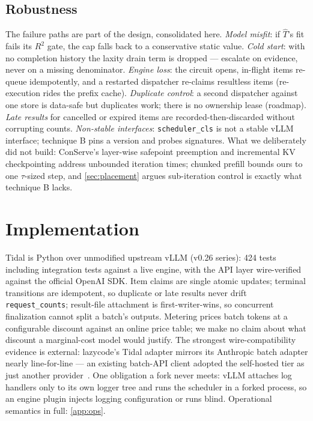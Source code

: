 \documentclass[11pt]{article}
\newcommand{\code}[1]{\texttt{#1}}
\begin{document}


\subsection{Robustness}
\label{sec:robustness}

The failure paths are part of the design, consolidated here. \emph{Model misfit}: if
$\hat{T}$'s fit fails its $R^2$ gate, the cap falls back to a conservative static value.
\emph{Cold start}: with no completion history the laxity drain term is dropped ---
escalate on evidence, never on a missing denominator. \emph{Engine loss}: the circuit
opens, in-flight items re-queue idempotently, and a restarted dispatcher re-claims
resultless items (re-execution rides the prefix cache). \emph{Duplicate control}: a
second dispatcher against one store is data-safe but duplicates work; there is no
ownership lease (roadmap). \emph{Late results} for cancelled or expired items are
recorded-then-discarded without corrupting counts. \emph{Non-stable interfaces}:
\code{scheduler\_cls} is not a stable vLLM interface; technique B pins a version and
probes signatures. What we deliberately did not build: ConServe's layer-wise safepoint
preemption and incremental KV checkpointing address unbounded iteration times; chunked
prefill bounds ours to one $\tau$-sized step, and \cref{sec:placement} argues
sub-iteration control is exactly what technique B lacks.

\section{Implementation}
\label{sec:impl}

Tidal is Python over unmodified upstream vLLM (v0.26 series): 424 tests including
integration tests against a live engine, with the API layer wire-verified against the
official OpenAI SDK. Item claims are single atomic updates; terminal transitions are
idempotent, so duplicate or late results never drift \code{request\_counts};
result-file attachment is first-writer-wins, so concurrent finalization cannot split a
batch's outputs. Metering prices batch tokens at a configurable discount against an
online price table; we make no claim about what discount a marginal-cost model would
justify. The strongest wire-compatibility evidence is external: lazycode's Tidal adapter
mirrors its Anthropic batch adapter nearly line-for-line --- an existing batch-API client
adopted the self-hosted tier as just another provider~\citep{lazycode-paper}. One
obligation a fork never meets: vLLM attaches log handlers only to its own logger tree and
runs the scheduler in a forked process, so an engine plugin injects logging configuration
or runs blind. Operational semantics in full: \cref{app:ops}.
\end{document}
